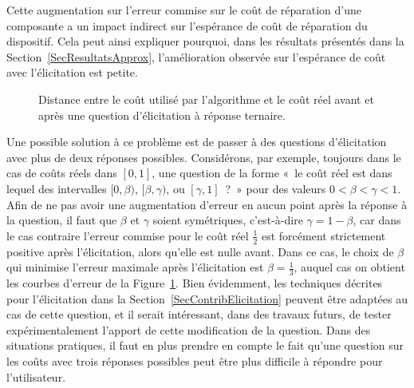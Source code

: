 \documentclass[a4paper,11pt]{article}
\theoremstyle{plain}
\theoremstyle{definition}
\begin{document}
Cette augmentation sur l'erreur commise sur le coût de réparation d'une composante a un impact indirect sur l'espérance de coût de réparation du dispositif. Cela peut ainsi expliquer pourquoi, dans les résultats présentés dans la Section~\ref{SecResultatsApprox}, l'amélioration observée sur l'espérance de coût avec l'élicitation est petite.

\begin{figure}[ht]
\centering
\resizebox{0.5\textwidth}{!}{}
\caption{Distance entre le coût utilisé par l'algorithme et le coût réel avant et après une question d'élicitation à réponse ternaire.}
\label{FigElicitationTernaire}
\end{figure}

Une possible solution à ce problème est de passer à des questions d'élicitation avec plus de deux réponses possibles. Considérons, par exemple, toujours dans le cas de coûts réels dans $[0, 1]$, une question de la forme «~le coût réel est dans lequel des intervalles $[0, \beta)$, $[\beta, \gamma)$, ou $[\gamma, 1]$~?~» pour des valeurs $0 < \beta < \gamma < 1$. Afin de ne pas avoir une augmentation d'erreur en aucun point après la réponse à la question, il faut que $\beta$ et $\gamma$ soient symétriques, c'est-à-dire $\gamma = 1 - \beta$, car dans le cas contraire l'erreur commise pour le coût réel $\frac{1}{2}$ est forcément strictement positive après l'élicitation, alors qu'elle est nulle avant. Dans ce cas, le choix de $\beta$ qui minimise l'erreur maximale après l'élicitation est $\beta = \frac{1}{3}$, auquel cas on obtient les courbes d'erreur de la Figure~\ref{FigElicitationTernaire}. Bien évidemment, les techniques décrites pour l'élicitation dans la Section~\ref{SecContribElicitation} peuvent être adaptées au cas de cette question, et il serait intéressant, dans des travaux futurs, de tester expérimentalement l'apport de cette modification de la question. Dans des situations pratiques, il faut en plus prendre en compte le fait qu'une question sur les coûts avec trois réponses possibles peut être plus difficile à répondre pour l'utilisateur.





\end{document}
